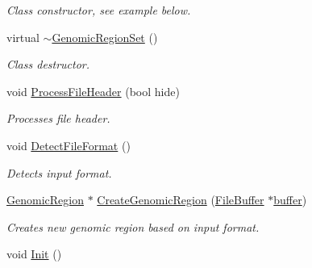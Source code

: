 \begin{DoxyCompactItemize}
\begin{DoxyCompactList}\small\item\em Class constructor, see example below. \end{DoxyCompactList}\item 
\hypertarget{classGenomicRegionSet_a3fc7c6dc31cffcedf97a7b69a7f3c2c8}{
virtual \hyperlink{classGenomicRegionSet_a3fc7c6dc31cffcedf97a7b69a7f3c2c8}{$\sim$GenomicRegionSet} ()}
\label{classGenomicRegionSet_a3fc7c6dc31cffcedf97a7b69a7f3c2c8}

\begin{DoxyCompactList}\small\item\em Class destructor. \end{DoxyCompactList}\item 
\hypertarget{classGenomicRegionSet_a6992ccc0c4dd8be0ad4be9b991ab9f36}{
void \hyperlink{classGenomicRegionSet_a6992ccc0c4dd8be0ad4be9b991ab9f36}{ProcessFileHeader} (bool hide)}
\label{classGenomicRegionSet_a6992ccc0c4dd8be0ad4be9b991ab9f36}

\begin{DoxyCompactList}\small\item\em Processes file header. \end{DoxyCompactList}\item 
\hypertarget{classGenomicRegionSet_a5721a1d9ca4ca18ddbcad1e563d42019}{
void \hyperlink{classGenomicRegionSet_a5721a1d9ca4ca18ddbcad1e563d42019}{DetectFileFormat} ()}
\label{classGenomicRegionSet_a5721a1d9ca4ca18ddbcad1e563d42019}

\begin{DoxyCompactList}\small\item\em Detects input format. \end{DoxyCompactList}\item 
\hypertarget{classGenomicRegionSet_a4e8e101aebcedd6a5892d463fe830450}{
\hyperlink{classGenomicRegion}{GenomicRegion} $\ast$ \hyperlink{classGenomicRegionSet_a4e8e101aebcedd6a5892d463fe830450}{CreateGenomicRegion} (\hyperlink{classFileBuffer}{FileBuffer} $\ast$\hyperlink{classGenomicRegionSet_adf3a5598e31ddbb5b381125925362085}{buffer})}
\label{classGenomicRegionSet_a4e8e101aebcedd6a5892d463fe830450}

\begin{DoxyCompactList}\small\item\em Creates new genomic region based on input format. \end{DoxyCompactList}\item 
\hypertarget{classGenomicRegionSet_a94b1955e7a4127efaceba25429af7568}{
void \hyperlink{classGenomicRegionSet_a94b1955e7a4127efaceba25429af7568}{Init} ()}
\label{classGenomicRegionSet_a94b1955e7a4127efaceba25429af7568}


\end{DoxyCompactItemize}

